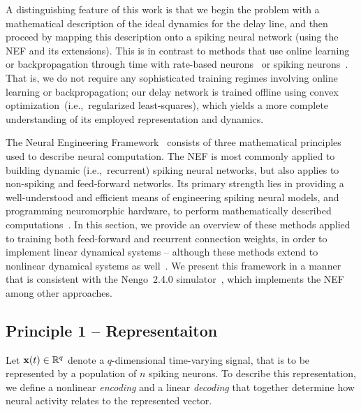 A distinguishing feature of this work is that we begin the problem with a mathematical description of the ideal dynamics for the delay line, and then proceed by mapping this description onto a spiking neural network (using the NEF and its extensions).
This is in contrast to methods that use online learning or backpropagation through time with rate-based neurons~\citep{de1992gamma, sussillo2009generating} or spiking neurons~\citep{nicola2016supervised, huh2017gradient, gilra2017predicting, alemi2017learning}.
That is, we do not require any sophisticated training regimes involving online learning or backpropagation; our delay network is trained offline using convex optimization~(i.e.,~regularized least-squares), which yields a more complete understanding of its employed representation and dynamics.

The Neural Engineering Framework~\citep[NEF;][]{eliasmith1999developing, eliasmith2003a} consists of three mathematical principles used to describe neural computation.
The NEF is most commonly applied to building dynamic (i.e.,~recurrent) spiking neural networks, but also applies to non-spiking and feed-forward networks.
Its primary strength lies in providing a well-understood and efficient means of engineering spiking neural models, and programming neuromorphic hardware, to perform mathematically described computations~\citep{eliasmith2013build, boahen2017neuromorph}.
In this section, we provide an overview of these methods applied to training both feed-forward and recurrent connection weights, in order to implement linear dynamical systems -- although these methods extend to nonlinear dynamical systems as well~\citep{voelker2017iscas, voelker2017neuromorphic}.
We present this framework in a manner that is consistent with the Nengo~2.4.0 simulator~\citep{bekolay2013}, which implements the NEF among other approaches.

\subsection{Principle 1 -- Representaiton}
\label{sec:principle1}

Let $\mathbf{x}(t) \in \mathbb{R}^q$ denote a $q$-dimensional time-varying signal, that is to be represented by a population of $n$ spiking neurons.
To describe this representation, we define a nonlinear \emph{encoding} and a linear \emph{decoding} that together determine how neural activity relates to the represented vector.

